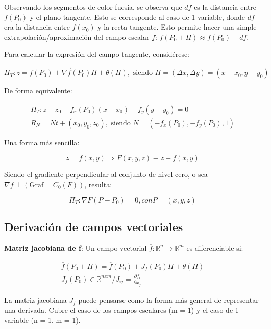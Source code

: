 \documentclass{article}
\renewcommand{\Bbb}{\mathbb}
\begin{document}
Observando los segmentos de color fucsia, se observa que $df$ es la distancia entre $f(P_0)$ y el plano tangente. Esto se corresponde al caso de 1 variable, donde $df$ era la distancia entre $f(x_0)$ y la recta tangente. Esto permite hacer una simple extrapolación/aproximación del campo escalar $f$: $f(P_0 + H) \approx f(P_0) + df$. 

Para calcular la expresión del campo tangente, considérese:

\begin{equation}
\Pi_T: z = f(P_0) + \overrightarrow{\nabla{f}}(P_0) H + \theta(H), \text{ siendo } H = (\Delta x, \Delta y) = (x-x_0, y-y_0)
\end{equation}

De forma equivalente:

\begin{gather}
\Pi_T: z-z_0 - f_x(P_0) (x-x_0) - f_y (y-y_0) = 0 \\
R_N = N t + (x_0, y_0, z_0), \text{ siendo } N = (-f_x(P_0), -f_y(P_0), 1)
\end{gather}

Una forma más sencilla:

\begin{equation}
z = f(x,y) \Rightarrow F(x,y,z) \equiv z - f(x,y)
\end{equation}

Siendo el gradiente perpendicular al conjunto de nivel cero, o sea $\nabla{f} \perp (\text{Graf} = C_0(F))$, resulta:

\begin{equation}
\Pi_T: \nabla{F} (P - P_0) = 0, { con } P = (x,y,z)
\end{equation}

\subsection{Derivación de campos vectoriales}

\textbf{Matriz jacobiana de f}: Un campo vectorial $\overline{f}: \Bbb R^n \rightarrow \Bbb R^m$ es diferenciable si:

\begin{gather}
\overline{f}(P_0 + H) = \overline{f}(P_0) + J_f(P_0) H + \theta(H) \\
J_f(P_0) \in \Bbb R^{n x m} / J_{ij} = \frac{\partial f_i}{\partial x_j} 
\end{gather}

La matriz jacobiana $J_f$ puede pensarse como la forma más general de representar una derivada. Cubre el caso de los campos escalares (m = 1) y el caso de 1 variable (n = 1, m = 1).
\end{document}
